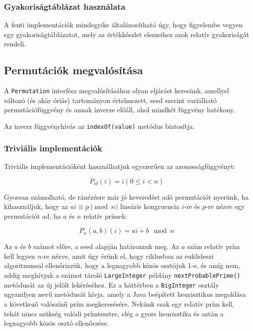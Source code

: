\documentclass[
    parspace,
    noindent,
    nohyp,
]{elteiktdk}[2023/04/10]
\begin{document}


\subsubsection{Gyakoriságtáblázat használata}

A fenti implementációk mindegyike általánosítható úgy, hogy figyelembe vegyen egy gyakoriságtáblázatot,
mely az értékkészlet elemeihez azok relatív gyakoriságát rendeli.


\subsection{Permutációk megvalósítása}

A \texttt{Permutation} interfész megvalósításához olyan eljárást keresünk, amellyel változó (és akár óriás) tartományon értelmezett,
seed szerint variálható permutációfüggvény és annak inverze előáll, ahol mindkét függvény hatékony.

Az inverz függvényhívás az \texttt{indexOf(value)} metódus biztosítja.

\subsubsection{Triviális implementációk}

Triviális implementációként használhatjuk egyszerűen az azonosságfüggvényt:

$$
P_{id}(i) = i (0 \leq i < n)
$$

Gyorsan számolható, de ránézésre már jó keveredést adó permutációt nyerünk, ha kihasználjuk, hogy az $ai \equiv p \pmod{n}$ lineáris kongruencia
$i$-re és $p$-re nézve egy permutációt ad, ha $a$ és $n$ relatív prímek:

$$
P_n(a,b)(i) = ai + b \mod n
$$

Az $a$ és $b$ számot előre, a seed alapján határozzuk meg.
Az $a$ szám relatív prím kell legyen $n$-re nézve, amit úgy érünk el, hogy ciklusban az euklideszi algoritmussal ellenőrizzük, hogy a legnagyobb közös osztójuk 1-e,
és amíg nem, addig meghívjuk a számot tároló \texttt{LargeInteger} példány \texttt{nextProbablePrime()} metódusát az új jelölt lekéréséhez.
Ez a háttérben a \texttt{BigInteger} osztály ugyanilyen nevű metódusát hívja, amely a Java beépített heurisztikus megoldása a következő valószínű prím megkeresésére.
Nekünk csak egy relatív prím kell, tehát nincs szükség valódi prímtesztre, elég a gyors heurisztika és aztán a legnagyobb közös osztó ellenőrzése.
\end{document}
